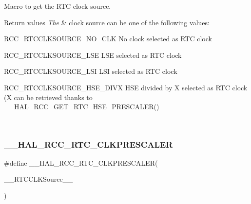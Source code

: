 Macro to get the R\+TC clock source. 


\begin{DoxyRetVals}{Return values}
{\em The} & clock source can be one of the following values\+: \begin{DoxyItemize}
\item R\+C\+C\+\_\+\+R\+T\+C\+C\+L\+K\+S\+O\+U\+R\+C\+E\+\_\+\+N\+O\+\_\+\+C\+LK No clock selected as R\+TC clock \item R\+C\+C\+\_\+\+R\+T\+C\+C\+L\+K\+S\+O\+U\+R\+C\+E\+\_\+\+L\+SE L\+SE selected as R\+TC clock \item R\+C\+C\+\_\+\+R\+T\+C\+C\+L\+K\+S\+O\+U\+R\+C\+E\+\_\+\+L\+SI L\+SI selected as R\+TC clock \item R\+C\+C\+\_\+\+R\+T\+C\+C\+L\+K\+S\+O\+U\+R\+C\+E\+\_\+\+H\+S\+E\+\_\+\+D\+I\+VX H\+SE divided by X selected as R\+TC clock (X can be retrieved thanks to \hyperlink{group___r_c_c___internal___r_t_c___clock___configuration_ga85dc62f0fcb14981c47d7f7da25e26d6}{\+\_\+\+\_\+\+H\+A\+L\+\_\+\+R\+C\+C\+\_\+\+G\+E\+T\+\_\+\+R\+T\+C\+\_\+\+H\+S\+E\+\_\+\+P\+R\+E\+S\+C\+A\+L\+E\+R()} \end{DoxyItemize}
\\
\hline
\end{DoxyRetVals}
\mbox{\label{group___r_c_c___internal___r_t_c___clock___configuration_ga7e10e306e7d9f3cd59d30dcb2c9cf61d}} 
\subsubsection{\texorpdfstring{\+\_\+\+\_\+\+H\+A\+L\+\_\+\+R\+C\+C\+\_\+\+R\+T\+C\+\_\+\+C\+L\+K\+P\+R\+E\+S\+C\+A\+L\+ER}{\_\_HAL\_RCC\_RTC\_CLKPRESCALER}}
{\footnotesize\ttfamily \#define \+\_\+\+\_\+\+H\+A\+L\+\_\+\+R\+C\+C\+\_\+\+R\+T\+C\+\_\+\+C\+L\+K\+P\+R\+E\+S\+C\+A\+L\+ER(\begin{DoxyParamCaption}\item[{}]{\+\_\+\+\_\+\+R\+T\+C\+C\+L\+K\+Source\+\_\+\+\_\+ }\end{DoxyParamCaption})}

